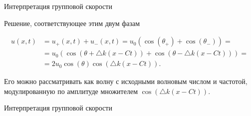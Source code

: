 \documentclass[10pt,xcolor=pst,aspectratio=169]{beamer}
\begin{document}
\begin{frame}{Интерпретация групповой скорости}

	\transdissolve[duration=0.1]
	\justifying
	\large

    Решение, соответствующее этим двум фазам

    \[
        \begin{split}
            u \left( x, t \right) & = u_{+} \left( x, t \right) + u_{-} \left( x, t \right) = u_{0} \left( \cos \left( \theta_{+} \right) + \cos \left( \theta_{-} \right) \right) = \\
            & = u_{0} \left( \cos \left( \theta + \triangle k \left( x - C t \right) \right) + \cos \left( \theta - \triangle k \left( x - C t \right) \right) \right) = \\
            & = 2 u_{0} \cos \left( \theta \right) \cos \left( \triangle k \left( x - C t \right) \right) .
        \end{split}
    \]

    Его можно рассматривать как волну с исходными волновым числом и частотой, модулированную по амплитуде множителем $\cos \left( \triangle k \left( x - C t \right) \right)$.

    \begin{center}
    \end{center}

\end{frame}

\begin{frame}{Интерпретация групповой скорости}

	\transdissolve[duration=0.1]
	\justifying
	\large

    

\end{frame}
\end{document}
